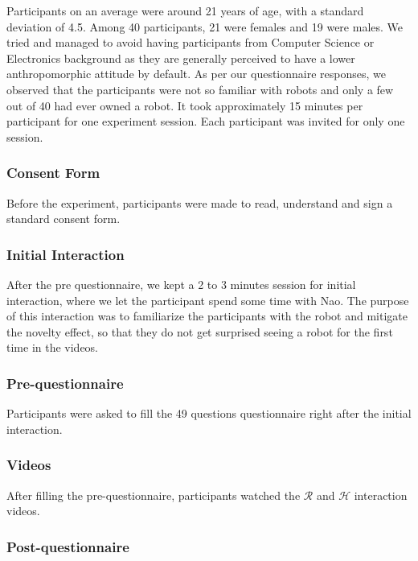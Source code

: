 \documentclass[a4,twocolumn,10pt]{article}
\begin{document}
Participants on an average were around 21 years of age, with a standard
deviation of 4.5. Among 40 participants, 21 were females and 19 were males.  We
tried and managed to avoid having participants from Computer Science or
Electronics background as they are generally perceived to have a lower
anthropomorphic attitude by default. As per our questionnaire responses, we
observed that the participants were not so familiar with robots and only a few
out of 40 had ever owned a robot.  It took approximately 15 minutes per
participant for one experiment session.  Each participant was invited for only
one session. 

\subsubsection{Consent Form}

Before the experiment, participants were made to read, understand and sign a
standard consent form.

\subsubsection{Initial Interaction}

After the pre questionnaire, we kept a 2 to 3 minutes session for initial
interaction, where we let the participant spend some time with Nao.
The purpose of this interaction was to familiarize the participants with the
robot and mitigate the novelty effect, so that they do not get surprised seeing
a robot for the first time in the videos.

\subsubsection{Pre-questionnaire}

Participants were asked to fill the 49 questions questionnaire right after the
initial interaction.

\subsubsection{Videos}

After filling the pre-questionnaire, participants watched the $\mathcal{R}$ and
$\mathcal{H}$ interaction videos.

\subsubsection{Post-questionnaire}
\end{document}
